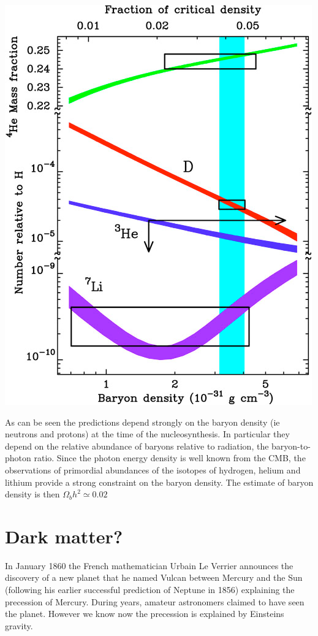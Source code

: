 \documentclass[
  letterpaper,
  DIV=11,
  numbers=noendperiod]{scrreprt}
\begin{document}
\includegraphics{images/BBN.png}

As can be seen the predictions depend strongly on the baryon density (ie
neutrons and protons) at the time of the nucleosynthesis. In particular
they depend on the relative abundance of baryons relative to radiation,
the baryon-to-photon ratio. Since the photon energy density is well
known from the CMB, the observations of primordial abundances of the
isotopes of hydrogen, helium and lithium provide a strong constraint on
the baryon density. The estimate of baryon density is then
\(\Omega_b h^2 \simeq 0.02\)

\section{Dark matter?}\label{dark-matter-1}

In January 1860 the French mathematician Urbain Le Verrier announces the
discovery of a new planet that he named Vulcan between Mercury and the
Sun (following his earlier successful prediction of Neptune in 1856)
explaining the precession of Mercury. During years, amateur astronomers
claimed to have seen the planet. However we know now the precession is
explained by Einsteins gravity.
\end{document}
